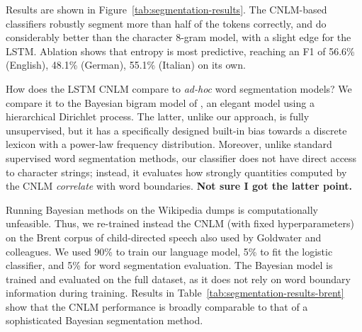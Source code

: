 


Results are shown in Figure~\ref{tab:segmentation-results}. The
CNLM-based classifiers robustly segment more than half of the tokens
correctly, and do considerably better than the character 8-gram model,
with a slight edge for the LSTM. Ablation shows that entropy is most
predictive, reaching an F1 of 56.6\% (English), 48.1\% (German), 55.1\%
(Italian) on its own.%

How does the LSTM CNLM compare to \emph{ad-hoc} word segmentation
models?  We compare it to the Bayesian bigram model of
, an elegant model using a
hierarchical Dirichlet process.  The latter, unlike our approach, is
fully unsupervised, but it has a specifically designed built-in bias
towards a discrete lexicon with a power-law frequency distribution.
Moreover, unlike standard supervised word segmentation methods, our
classifier does not have direct access to character strings; instead,
it evaluates how strongly quantities computed by the CNLM
\emph{correlate} with word boundaries. \textbf{Not sure I got the
  latter point.}

Running Bayesian methods on the Wikipedia dumps is computationally
unfeasible. Thus, we re-trained instead the CNLM (with fixed
hyperparameters) on the Brent corpus of child-directed speech
\cite{brent-efficient-1999} also used by Goldwater and colleagues.  We
used 90\% to train our language model, 5\% to fit the logistic
classifier, and 5\% for word segmentation evaluation.  The Bayesian
model is trained and evaluated on the full dataset, as it does not
rely on word boundary information during training. Results in
Table~\ref{tab:segmentation-results-brent} show that the CNLM
performance is broadly comparable to that of a sophisticated Bayesian
segmentation method.


